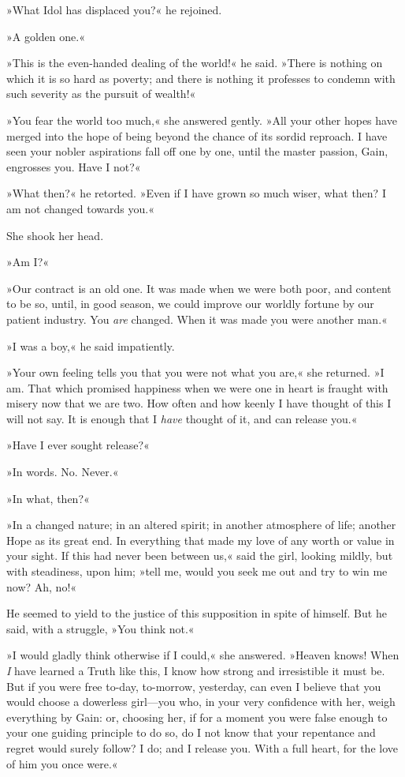 »What Idol has displaced you?« he rejoined.

»A golden one.«

»This is the even-handed dealing of the world!« he said. »There is nothing on which it is so hard as poverty; and there is nothing it professes to condemn with such severity as the pursuit of wealth!«

»You fear the world too much,« she answered gently. »All your other hopes have merged into the hope of being beyond the chance of its sordid reproach. I have seen your nobler aspirations fall off one by one, until the master passion, Gain, engrosses you. Have I not?«

»What then?« he retorted. »Even if I have grown so much wiser, what then? I am not changed towards you.«

She shook her head.

»Am I\@?«

»Our contract is an old one. It was made when we were both poor, and content to be so, until, in good season, we could improve our worldly fortune by our patient industry. You \textit{are} changed. When it was made you were another man.«

»I was a boy,« he said impatiently.

»Your own feeling tells you that you were not what you are,« she returned. »I am. That which promised happiness when we were one in heart is fraught with misery now that we are two. How often and how keenly I have thought of this I will not say. It is enough that I \textit{have} thought of it, and can release you.«

»Have I ever sought release?«

»In words. No. Never.«

»In what, then?«

»In a changed nature; in an altered spirit; in another atmosphere of life; another Hope as its great end. In everything that made my love of any worth or value in your sight. If this had never been between us,« said the girl, looking mildly, but with steadiness, upon him; »tell me, would you seek me out and try to win me now? Ah, no!«

He seemed to yield to the justice of this supposition in spite of himself. But he said, with a struggle, »You think not.«

»I would gladly think otherwise if I could,« she answered. »Heav\-en knows! When \textit{I} have learned a Truth like this, I know how strong and irresistible it must be. But if you were free to-day, to-morrow, yesterday, can even I believe that you would choose a dowerless girl---you who, in your very confidence with her, weigh everything by Gain: or, choosing her, if for a moment you were false enough to your one guiding principle to do so, do I not know that your repentance and regret would surely follow? I do; and I release you. With a full heart, for the love of him you once were.«

